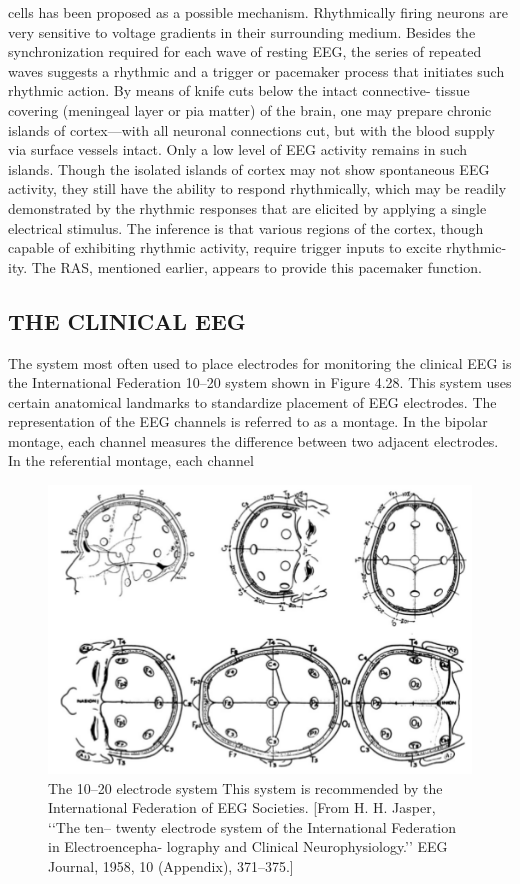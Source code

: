 cells has been proposed as a possible mechanism. Rhythmically firing neurons are
very sensitive to voltage gradients in their surrounding medium.
Besides the synchronization required for each wave of resting EEG, the series
of repeated waves suggests a rhythmic and a trigger or pacemaker process that
initiates such rhythmic action. By means of knife cuts below the intact connective-
tissue covering (meningeal layer or pia matter) of the brain, one may prepare
chronic islands of cortex—with all neuronal connections cut, but with the blood
supply via surface vessels intact. Only a low level of EEG activity remains in such
islands. Though the isolated islands of cortex may not show spontaneous EEG
activity, they still have the ability to respond rhythmically, which may be readily
demonstrated by the rhythmic responses that are elicited by applying a single
electrical stimulus. The inference is that various regions of the cortex, though
capable of exhibiting rhythmic activity, require trigger inputs to excite rhythmic-
ity. The RAS, mentioned earlier, appears to provide this pacemaker function.


\subsection{THE CLINICAL EEG}

The system most often used to place electrodes for monitoring the clinical
EEG is the International Federation 10–20 system shown in Figure 4.28. This
system uses certain anatomical landmarks to standardize placement of EEG
electrodes. The representation of the EEG channels is referred to as a
montage. In the bipolar montage, each channel measures the difference
between two adjacent electrodes. In the referential montage, each channel

\begin{figure}
\centering
\includegraphics[width=0.7\linewidth]{figura_6.png} 
\caption{The 10–20 electrode system This system is recommended by the
International Federation of EEG Societies. [From H. H. Jasper, ‘‘The ten–
twenty electrode system of the International Federation in Electroencepha-
lography and Clinical Neurophysiology.’’ EEG Journal, 1958, 10 (Appendix),
371–375.]}
\end{figure}

